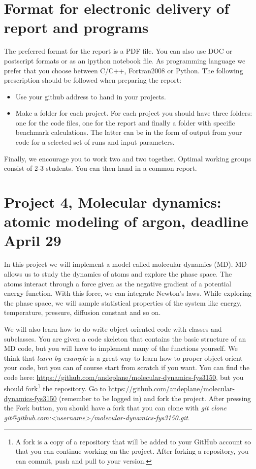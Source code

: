 \documentclass[11pt,a4wide]{article}
\begin{document}
\section*{Format for electronic delivery of report and programs}
%
The preferred format for the report is a PDF file. You can also
use DOC or postscript formats or as an ipython notebook file. 
As programming language we prefer that you choose between C/C++, Fortran2008 or Python.
The following prescription should be followed when preparing the report:
\begin{itemize}
\item Use your github address  to hand in your projects.
\item Make a folder for each project. For each project you should have three folders: one for the code files, one for the report and finally a folder with specific benchmark calculations. The latter can be in the form of output from your code
for a selected set of runs and input parameters. 

\end{itemize}

Finally, 
we encourage you to work two and two together. Optimal working groups consist of 
2-3 students. You can then hand in a common report. 



\section*{Project 4, Molecular dynamics: atomic modeling of argon, deadline  April 29}

In this project we will implement a model called molecular dynamics
(MD). MD allows us to study the dynamics of atoms and explore the
phase space. 
The atoms interact through a
force given as the negative gradient of a potential energy
function. With this force, we can integrate Newton's laws. While
exploring the phase space, we will sample statistical properties of
the system like energy, temperature, pressure, diffusion constant and
so on.

We will also learn how to do write object oriented code with classes and subclasses. You are given a code skeleton that contains the basic structure of an MD code, but you will have to implement many of the functions yourself. We think that \textit{learn by example} is a great way to learn how to proper object orient your code, but you can of course start from scratch if you want. You can find the code here: \url{https://github.com/andeplane/molecular-dynamics-fys3150}, but you should fork\footnote{A fork is a copy of a repository that will be added to your GitHub account so that you can continue working on the project. After forking a repository, you can commit, push and pull to your version.} the repository. Go to \url{https://github.com/andeplane/molecular-dynamics-fys3150} (remember to be logged in) and fork the project. After pressing the Fork button, you should have a fork that you can clone with \textit{git clone git@github.com:<username>/molecular-dynamics-fys3150.git}.
\end{document}
